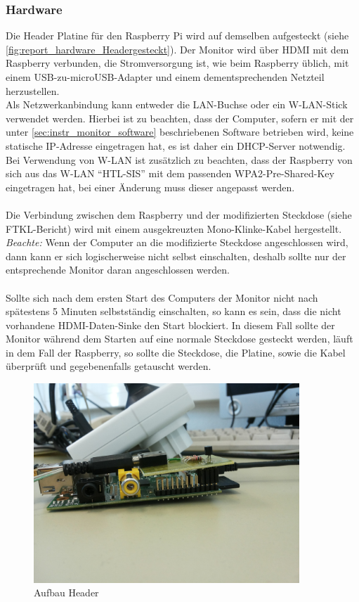 \subsubsection{Hardware}
Die Header Platine für den Raspberry Pi wird auf demselben aufgesteckt (siehe \autoref{fig:report_hardware_Headergesteckt}). Der Monitor wird über HDMI mit dem Raspberry verbunden, die Stromversorgung ist, wie beim Raspberry üblich, mit einem USB-zu-microUSB-Adapter und einem dementsprechenden Netzteil herzustellen.\\
Als Netzwerkanbindung kann entweder die LAN-Buchse oder ein W-LAN-Stick verwendet werden. Hierbei ist zu beachten, dass der Computer, sofern er mit der unter  \autoref{sec:instr_monitor_software} beschriebenen Software betrieben wird, keine statische IP-Adresse eingetragen hat, es ist daher ein DHCP-Server notwendig. Bei Verwendung von W-LAN ist zusätzlich zu beachten, dass der Raspberry von sich aus das W-LAN \enquote{HTL-SIS} mit dem passenden WPA2-Pre-Shared-Key eingetragen hat, bei einer Änderung muss dieser angepasst werden.\\
\\
Die Verbindung zwischen dem Raspberry und der modifizierten Steckdose (siehe FTKL-Bericht) wird mit einem ausgekreuzten Mono-Klinke-Kabel hergestellt.\\
\textit{Beachte:} Wenn der Computer an die modifizierte Steckdose angeschlossen wird, dann kann er sich logischerweise nicht selbst einschalten, deshalb sollte nur der entsprechende Monitor daran angeschlossen werden.\\
\\
Sollte sich nach dem ersten Start des Computers der Monitor nicht nach spätestens 5 Minuten selbstständig einschalten, so kann es sein, dass die nicht vorhandene HDMI-Daten-Sinke den Start blockiert. In diesem Fall sollte der Monitor während dem Starten auf eine normale Steckdose gesteckt werden, läuft in dem Fall der Raspberry, so sollte die Steckdose, die Platine, sowie die Kabel überprüft und gegebenenfalls getauscht werden.

\begin{figure}[H]
\centering
\includegraphics[keepaspectratio=true, width=10cm]{images/rpi/rpi_header_gesteckt.jpg}
\caption{Aufbau Header}
\label{fig:report_hardware_Headergesteckt}
\end{figure}


